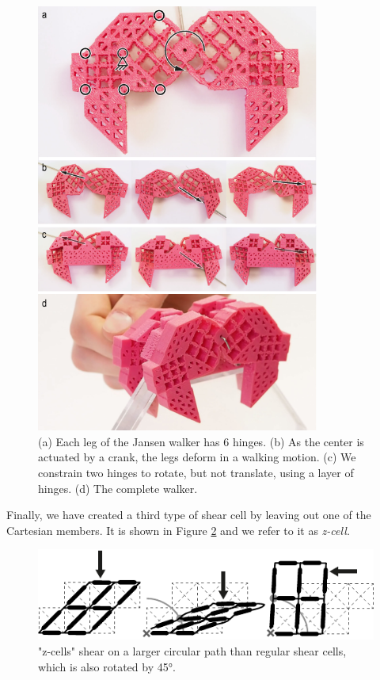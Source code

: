 \begin{figure} [!h]
    \centering
    \includegraphics[width=0.83\textwidth]{chapters/metamaterial-mechanisms-FIG/14-jansen-walker.pdf}
    \caption[Short figure name.]{(a) Each leg of the Jansen walker has 6 hinges. (b) As the center is actuated by a crank, the legs deform in a walking motion. (c) We constrain two hinges to rotate, but not translate, using a layer of hinges. (d) The complete walker.
    \label{fig:14-jansen-walker}}
\end{figure}

Finally, we have created a third type of shear cell by leaving out one of the Cartesian members. It is shown in Figure \ref{fig:15-z-cell-deformation} and we refer to it as \textit{z-cell.}

\begin{figure} [!h]  
    \includegraphics[width=\textwidth]{chapters/metamaterial-mechanisms-FIG/15-z-cell-deformation.pdf}
    \caption[Short figure name.]{"z-cells" shear on a larger circular path than regular shear cells, which is also rotated by 45°. 
    \label{fig:15-z-cell-deformation}}
\end{figure}

